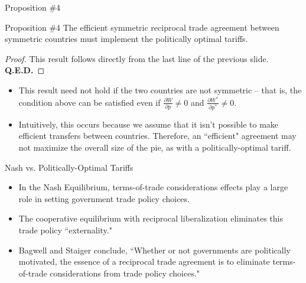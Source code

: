 \documentclass[aspectratio=169]{beamer}
\begin{document}

\begin{frame}{Proposition \#4}

\begin{theorem}{Proposition \#4}
    The efficient symmetric reciprocal trade agreement between symmetric countries must implement the politically optimal tariffs. 
\end{theorem}
\begin{proof}
    This result follows directly from the last line of the previous slide.  \textbf{Q.E.D.}
\end{proof}
\begin{itemize}
    \item<1-> This result need not hold if the two countries are not symmetric – that is, the condition above can be satisfied even if $ \frac{\partial W}{\partial p} \neq 0 $ and $ \frac{\partial W^{*}}{\partial p^{*}} \neq 0 $.
    \item<2-> Intuitively, this occurs because we assume that it isn’t possible to make efficient transfers between countries.  Therefore, an ``efficient" agreement may not maximize the overall size of the pie, as with a politically-optimal tariff.
\end{itemize}
    
\end{frame}


\begin{frame}{Nash vs. Politically-Optimal Tariffs}

\begin{itemize}
    \item<1-> In the Nash Equilibrium, terms-of-trade considerations effects play a large role in setting government trade policy choices.
    \item<2-> The cooperative equilibrium with reciprocal liberalization eliminates this trade policy ``externality."
    \item<3-> Bagwell and Staiger conclude, ``Whether or not governments are politically motivated, the essence of a reciprocal trade agreement is to eliminate terms-of-trade considerations from trade policy choices."
\end{itemize}
    
\end{frame}

\end{document}
